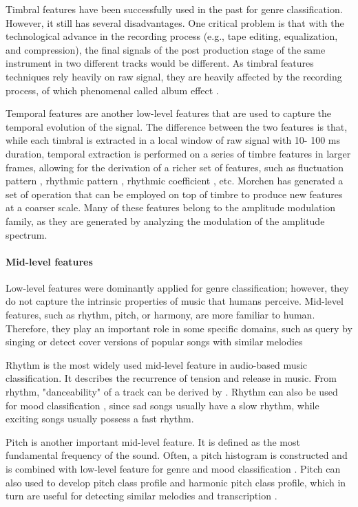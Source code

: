 Timbral features have been successfully used in the past for genre classification. However, it still has several disadvantages. One critical problem is that with the technological advance in the recording process  (e.g., tape editing, equalization, and compression), the final signals of the post production stage of the same instrument in two different tracks would be different. As timbral features techniques rely heavily on raw signal, they are heavily affected by the recording process, of which phenomenal called album effect \cite{whitman2001artist}.

Temporal features are another low-level features that are used to capture the temporal evolution of the signal. The difference between the two features is that, while each timbral is extracted in a local window of raw signal with 10- 100 ms duration, temporal extraction is performed on a series of timbre features in larger frames, allowing for the derivation of a richer set of features, such as fluctuation pattern \cite{pampalk2002content}, rhythmic pattern \cite{lidy2007improving}, rhythmic coefficient \cite{west2009novel}, etc. Morchen \cite{morchen2006modeling} has generated a set of operation that can be employed on top of timbre to produce new features at a coarser scale. Many of these features belong to the amplitude modulation family, as they are generated by analyzing the modulation of the amplitude spectrum. 

\paragraph{Mid-level features}
Low-level features were dominantly applied for genre classification; however, they do not capture the intrinsic properties of music that humans perceive. Mid-level features, such as rhythm, pitch, or harmony, are more familiar to human. Therefore, they play an important role in some specific domains, such as query by singing \cite{jang2008general} or detect cover versions of popular songs with similar melodies \cite{tsai2005query}

Rhythm is the most widely used mid-level feature in audio-based music classification. It describes the recurrence of tension and release in music. From rhythm, "danceability" of a track can be derived by . Rhythm can also be used for mood classification \cite{feng2003music} \cite{yang2004disambiguating}, since sad songs usually have a slow rhythm, while exciting songs usually possess a fast rhythm. 

Pitch is another important mid-level feature. It is defined as the most fundamental frequency of the sound. Often, a pitch histogram is constructed and is combined with low-level feature for genre and mood classification \cite{tzanetakis2002musical} \cite{li2003detecting}. Pitch can also used to develop pitch class profile and harmonic pitch class profile, which in turn are useful for detecting similar melodies and transcription \cite{marolt2006mid} \cite{poliner2007melody}. 

